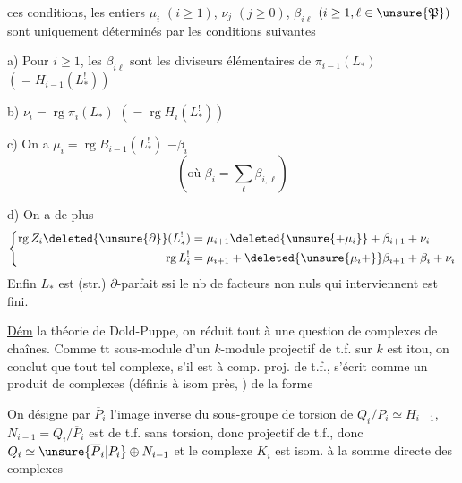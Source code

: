 ces conditions, les entiers $\mu_i$ $(i\geq1)$,
$\nu_j$ $(j\geq0)$, $\beta_{i\ell}$ $(i\geq1,\ell\in\unsure{\mathfrak P})$
sont uniquement
déterminés par les conditions suivantes

a) Pour  $i\geq1$, les $\beta_{i\ell}$ 
sont les  diviseurs
élémentaires de 
$\pi_{i-1}(L_*)$ $(=H_{i-1}(L^!_*))$

b)  $\nu_i=\operatorname{rg}\pi_i(L_*)$
$(=\operatorname{rg}H_i(L^!_*))$

c) On a  $\mu_i=\operatorname{rg}B_{i-1}(L^!_*)$
 $-\beta_i$
\[
(\text{où }\beta_i=\sum_\ell\beta_{i,\ell})
\]

d) On a de plus
\[
\left\{\begin{aligned}
\operatorname{rg}Z_i\deleted{\unsure{\partial}}(L^!_*)
 &=\mu_{i+1}\deleted{\unsure{+\mu_i}}+\beta_{i+1}+\nu_i\\
\operatorname{rg}L^!_i
 &=\mu_{i+1}+\deleted{\unsure{\mu_i+}}\beta_{i+1}+\beta_i+\nu_i
\end{aligned}\right.
\]
Enfin $L_*$ est (str.) $\partial$-parfait ssi le nb de
facteurs non nuls qui interviennent est fini.

\uline{Dém}   la théorie de Dold-Puppe,
on réduit tout à une question de
complexes de chaînes. Comme
tt sous-module d'un $k$-module
projectif de t.f. sur $k$ est itou, on
conclut que tout tel complexe,
s'il est   à comp. proj. de t.f.,
s'écrit comme un produit de
complexes (définis à isom 
 près, 
) de la forme

On désigne par $\overline P_i$ 
l'image inverse  du
sous-groupe de torsion de $Q_i/P_i\simeq H_{i-1}$,
$N_{i-1}=Q_i/\overline P_i$ est de t.f. sans torsion, donc
projectif de t.f., donc $Q_i\simeq\unsure{\overline P_i|P_i}\oplus N_{i-1}$
et le complexe $K_i$ est isom. à la
somme directe des complexes

